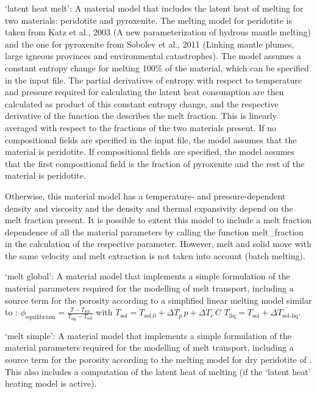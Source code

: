 \begin{itemize}
`latent heat melt': A material model that includes the latent heat of melting for two materials: peridotite and pyroxenite. The melting model for peridotite is taken from Katz et al., 2003 (A new parameterization of hydrous mantle melting) and the one for pyroxenite from Sobolev et al., 2011 (Linking mantle plumes, large igneous provinces and environmental catastrophes). The model assumes a constant entropy change for melting 100\% of the material, which can be specified in the input file. The partial derivatives of entropy with respect to temperature and pressure required for calculating the latent heat consumption are then calculated as product of this constant entropy change, and the respective derivative of the function the describes the melt fraction. This is linearly averaged with respect to the fractions of the two materials present. If no compositional fields are specified in the input file, the model assumes that the material is peridotite. If compositional fields are specified, the model assumes that the first compositional field is the fraction of pyroxenite and the rest of the material is peridotite. 

Otherwise, this material model has a temperature- and pressure-dependent density and viscosity and the density and thermal expansivity depend on the melt fraction present. It is possible to extent this model to include a melt fraction dependence of all the material parameters by calling the function melt_fraction in the calculation of the respective parameter. However, melt and solid move with the same velocity and melt extraction is not taken into account (batch melting). 

`melt global': A material model that implements a simple formulation of the material parameters required for the modelling of melt transport, including a source term for the porosity according to a simplified linear melting model similar to \cite{schmeling2006}:
$\phi_{\text{equilibrium}} = \frac{T-T_{\text{sol}}}{T_{\text{liq}}-T_{\text{sol}}}$
with $T_{\text{sol}} = T_{\text{sol,0}} + \Delta T_p \, p + \Delta T_c \, C$ 
$T_{\text{liq}} = T_{\text{sol}}  + \Delta T_{\text{sol-liq}}$.

`melt simple': A material model that implements a simple formulation of the material parameters required for the modelling of melt transport, including a source term for the porosity according to the melting model for dry peridotite of \cite{KSL2003}. This also includes a computation of the latent heat of melting (if the `latent heat' heating model is active).


\end{itemize}
